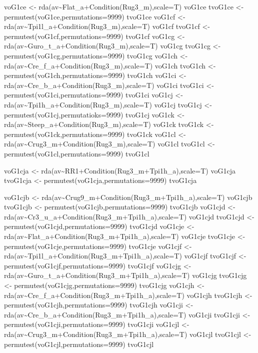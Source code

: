 \documentclass[]{article}
\begin{document}
voG1ce \textless{}-
rda(av\textasciitilde{}Flat\_a+Condition(Rug3\_m),scale=T) voG1ce
tvoG1ce \textless{}- permutest(voG1ce,permutations=9999) tvoG1ce voG1cf
\textless{}- rda(av\textasciitilde{}Tpi1l\_a+Condition(Rug3\_m),scale=T)
voG1cf tvoG1cf \textless{}- permutest(voG1cf,permutations=9999) tvoG1cf
voG1cg \textless{}-
rda(av\textasciitilde{}Guro\_t\_a+Condition(Rug3\_m),scale=T) voG1cg
tvoG1cg \textless{}- permutest(voG1cg,permutations=9999) tvoG1cg voG1ch
\textless{}-
rda(av\textasciitilde{}Cre\_f\_a+Condition(Rug3\_m),scale=T) voG1ch
tvoG1ch \textless{}- permutest(voG1ch,permutations=9999) tvoG1ch voG1ci
\textless{}-
rda(av\textasciitilde{}Cre\_b\_a+Condition(Rug3\_m),scale=T) voG1ci
tvoG1ci \textless{}- permutest(voG1ci,permutations=9999) tvoG1ci voG1cj
\textless{}- rda(av\textasciitilde{}Tpi1h\_a+Condition(Rug3\_m),scale=T)
voG1cj tvoG1cj \textless{}- permutest(voG1cj,permutatioks=9999) tvoG1cj
voG1ck \textless{}-
rda(av\textasciitilde{}Steep\_a+Condition(Rug3\_m),scale=T) voG1ck
tvoG1ck \textless{}- permutest(voG1ck,permutations=9999) tvoG1ck voG1cl
\textless{}- rda(av\textasciitilde{}Crug3\_m+Condition(Rug3\_m),scale=T)
voG1cl tvoG1cl \textless{}- permutest(voG1cl,permutations=9999) tvoG1cl

voG1cja \textless{}-
rda(av\textasciitilde{}RR1+Condition(Rug3\_m+Tpi1h\_a),scale=T) voG1cja
tvoG1cja \textless{}- permutest(voG1cja,permutations=9999) tvoG1cja

voG1cjb \textless{}-
rda(av\textasciitilde{}Crug9\_m+Condition(Rug3\_m+Tpi1h\_a),scale=T)
voG1cjb tvoG1cjb \textless{}- permutest(voG1cjb,permutations=9999)
tvoG1cjb voG1cjd \textless{}-
rda(av\textasciitilde{}Cr3\_u\_a+Condition(Rug3\_m+Tpi1h\_a),scale=T)
voG1cjd tvoG1cjd \textless{}- permutest(voG1cjd,permutations=9999)
tvoG1cjd voG1cje \textless{}-
rda(av\textasciitilde{}Flat\_a+Condition(Rug3\_m+Tpi1h\_a),scale=T)
voG1cje tvoG1cje \textless{}- permutest(voG1cje,permutations=9999)
tvoG1cje voG1cjf \textless{}-
rda(av\textasciitilde{}Tpi1l\_a+Condition(Rug3\_m+Tpi1h\_a),scale=T)
voG1cjf tvoG1cjf \textless{}- permutest(voG1cjf,permutations=9999)
tvoG1cjf voG1cjg \textless{}-
rda(av\textasciitilde{}Guro\_t\_a+Condition(Rug3\_m+Tpi1h\_a),scale=T)
voG1cjg tvoG1cjg \textless{}- permutest(voG1cjg,permutations=9999)
tvoG1cjg voG1cjh \textless{}-
rda(av\textasciitilde{}Cre\_f\_a+Condition(Rug3\_m+Tpi1h\_a),scale=T)
voG1cjh tvoG1cjh \textless{}- permutest(voG1cjh,permutations=9999)
tvoG1cjh voG1cji \textless{}-
rda(av\textasciitilde{}Cre\_b\_a+Condition(Rug3\_m+Tpi1h\_a),scale=T)
voG1cji tvoG1cji \textless{}- permutest(voG1cji,permutations=9999)
tvoG1cji voG1cjl \textless{}-
rda(av\textasciitilde{}Crug3\_m+Condition(Rug3\_m+Tpi1h\_a),scale=T)
voG1cjl tvoG1cjl \textless{}- permutest(voG1cjl,permutations=9999)
tvoG1cjl
\end{document}
